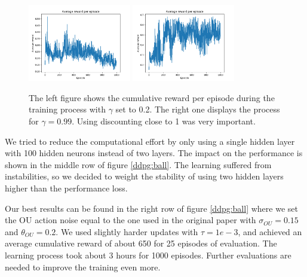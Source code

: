 \begin{figure}
	\centering
	\includegraphics[width=0.4\textwidth]{plots/ddpg_ball_low_gamma.png}
	\includegraphics[width=0.4\textwidth]{plots/ddpg_ball_high_gamma.png}
	\caption{The left figure shows the cumulative reward per episode during the training process with $\gamma$ set to 0.2. The right one displays the process for $\gamma=0.99$. Using discounting close to 1 was very important.}
	\label{ddpg:ball:gamma}
\end{figure}
We tried to reduce the computational effort by only using a single hidden layer with 100 hidden neurons instead of two layers. The impact on the performance is shown in the middle row of figure \ref{ddpg:ball}. The learning suffered from instabilities, so we decided to weight the stability of using two hidden layers higher than the performance loss.

Our best results can be found in the right row of figure \ref{ddpg:ball} where we set the OU action noise equal to the one used in the original paper with $\sigma_{OU}=0.15$ and $\theta_{OU}=0.2$. We used slightly harder updates with $\tau=1e-3$, and achieved an average cumulative reward of about 650 for 25 episodes of evaluation. The learning process took about 3 hours for 1000 episodes. Further evaluations are needed to improve the training even more.

